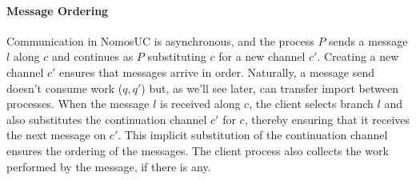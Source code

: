 \paragraph{Message Ordering}
Communication in NomosUC is asynchronous, and the process $P$ sends a message $l$
along $c$ and continues as $P$ substituting $c$ for a new channel $c'$. Creating a new
channel $c'$ ensures that messages arrive in order. 
Naturally, a message send doesn't consume work ($q,q'$) but, as we'll see later, can 
transfer import between processes. 
When the message $l$ is received along $c$, the client selects branch
$l$ and also substitutes the continuation channel $c'$ for $c$, thereby
ensuring that it receives the next message on $c'$. This implicit
substitution of the continuation channel ensures the ordering of the
messages.
The client process also collects the work performed by the message, if
there is any.

